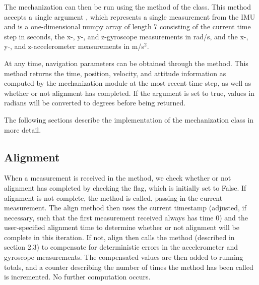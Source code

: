 \documentclass[11pt, oneside]{article}   	%
\begin{document}
The mechanization can then be run using the  method of the  class.  This method accepts a single argument , which represents a single measurement from the IMU and is a one-dimensional numpy array of length 7 consisting of the current time step in seconds, the x-, y-, and z-gyroscope measurements in rad/s, and the x-, y-, and z-accelerometer measurements in m/s$^2$.  

At any time, navigation parameters can be obtained through the  method.  This method returns the time, position, velocity, and attitude information as computed by the mechanization module at the most recent time step, as well as whether or not alignment has completed.  If the argument  is set to true, values in radians will be converted to degrees before being returned.

The following sections describe the implementation of the mechanization class in more detail.

\subsection{Alignment}
When a measurement is received in the  method, we check whether or not alignment has completed by checking the  flag, which is initially set to False.  If alignment is not complete, the  method is called, passing in the current measurement.  The align method then uses the current timestamp (adjusted, if necessary, such that the first measurement received always has time 0) and the user-specified alignment time to determine whether or not alignment will be complete in this iteration.  If not, align then calls the  method (described in section 2.3) to compensate for deterministic errors in the accelerometer and gyroscope measurements.  The compensated values are then added to running totals, and a counter describing the number of times the  method has been called is incremented.  No further computation occurs.
\end{document}
